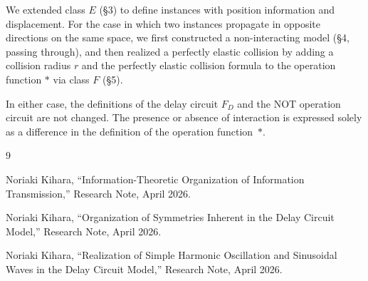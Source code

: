 \documentclass[12pt,a4paper]{article}
\begin{document}
We extended class $E$ (\S3) to define instances with position information and displacement. For the case in which two instances propagate in opposite directions on the same space, we first constructed a non-interacting model (\S4, passing through), and then realized a perfectly elastic collision by adding a collision radius $r$ and the perfectly elastic collision formula to the operation function $*$ via class $F$ (\S5).

In either case, the definitions of the delay circuit $F_D$ and the NOT operation circuit are not changed. The presence or absence of interaction is expressed solely as a difference in the definition of the operation function~$*$.

\begin{thebibliography}{9}

Noriaki Kihara,
``Information-Theoretic Organization of Information Transmission,''
Research Note, April 2026.

Noriaki Kihara,
``Organization of Symmetries Inherent in the Delay Circuit Model,''
Research Note, April 2026.

Noriaki Kihara,
``Realization of Simple Harmonic Oscillation and Sinusoidal Waves in the Delay Circuit Model,''
Research Note, April 2026.

\end{thebibliography}
\end{document}
